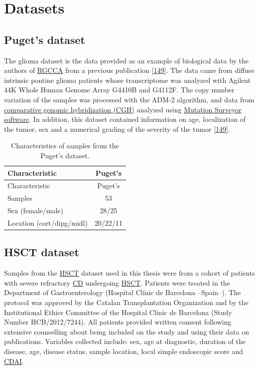 \documentclass[
  12pt,
  a4paper,
  twoside,
  openright]{book}
\begin{document}
\hypertarget{datasets}{%
\section{Datasets}\label{datasets}}

\hypertarget{methods-puget}{%
\subsection{Puget's dataset}\label{methods-puget}}

The glioma dataset is the data provided as an example of biological data by the authors of \protect\hyperlink{acronyms_RGCCA}{RGCCA} from a previous publication {[}\protect\hyperlink{ref-puget2012}{149}{]}.
The data came from diffuse intrinsic pontine glioma patients whose transcriptome was analyzed with Agilent 44K Whole Human Genome Array G4410B and G4112F.
The copy number variation of the samples was processed with the ADM-2 algorithm, and data from \protect\hyperlink{acronyms_CGH}{comparative genomic hybridization (CGH)} analyzed using \href{https://www.softgenetics.com/mutationSurveyor.php}{Mutation Surveyor software}.
In addition, this dataset contained information on age, localization of the tumor, sex and a numerical grading of the severity of the tumor {[}\protect\hyperlink{ref-puget2012}{149}{]}.

\begin{longtable}[]{@{}lc@{}}
\caption{\label{tab:Puget} Characteristics of samples from the Puget's dataset.}\tabularnewline
\toprule
Characteristic & Puget's \\
\midrule
\endfirsthead
\toprule
Characteristic & Puget's \\
\midrule
\endhead
Samples & 53 \\
Sex (female/male) & 28/25 \\
Location (cort/dipg/midl) & 20/22/11 \\
\bottomrule
\end{longtable}

\hypertarget{methods-hsct}{%
\subsection{HSCT dataset}\label{methods-hsct}}

Samples from the \protect\hyperlink{acronyms_HSCT}{HSCT} dataset used in this thesis were from a cohort of patients with severe refractory \protect\hyperlink{acronyms_CD}{CD} undergoing \protect\hyperlink{acronyms_HSCT}{HSCT}.
Patients were treated in the Department of Gastroenterology (Hospital Clínic de Barcelona --Spain--).
The protocol was approved by the Catalan Transplantation Organization and by the Institutional Ethics Committee of the Hospital Clinic de Barcelona (Study Number HCB/2012/7244).
All patients provided written consent following extensive counselling about being included on the study and using their data on publications. Variables collected include: sex, age at diagnostic, duration of the disease, age, disease status, sample location, local simple endoscopic score and \protect\hyperlink{acronyms_CDAI}{CDAI}.
\end{document}
